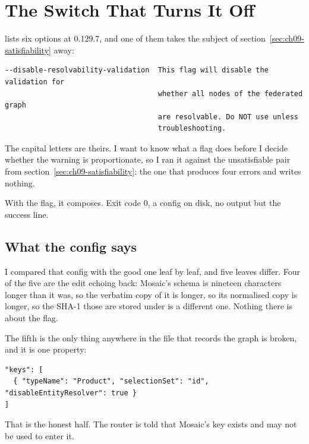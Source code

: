 \section{The Switch That Turns It Off}
\label{sec:ch09-turning-the-check-off}
%

 lists six options at 0.129.7, and one of them
takes the subject of section~\ref{sec:ch09-satisfiability} away:

\begin{verbatim}
--disable-resolvability-validation  This flag will disable the validation for
                                    whether all nodes of the federated graph
                                    are resolvable. Do NOT use unless
                                    troubleshooting.
\end{verbatim}

The capital letters are theirs. I want to know what a flag does before I decide
whether the warning is proportionate, so I ran it against the unsatisfiable pair
from section~\ref{sec:ch09-satisfiability}: the one that produces four errors
and writes nothing.

With the flag, it composes. Exit code 0, a config on disk, no output but the
success line.

\subsection*{What the config says}

%
I compared that config with the good one leaf by leaf, and five leaves differ.
Four of the five are the edit echoing back: Mosaic's schema is nineteen
characters longer than it was, so the verbatim copy of it is longer, so its
normalised copy is longer, so the SHA-1 those are stored under is a different
one. Nothing there is about the flag.

The fifth is the only thing anywhere in the file that records the graph is
broken, and it is one property:

\begin{verbatim}
"keys": [
  { "typeName": "Product", "selectionSet": "id", "disableEntityResolver": true }
]
\end{verbatim}

That is the honest half. The router is told that Mosaic's  key
exists and may not be used to enter it.

